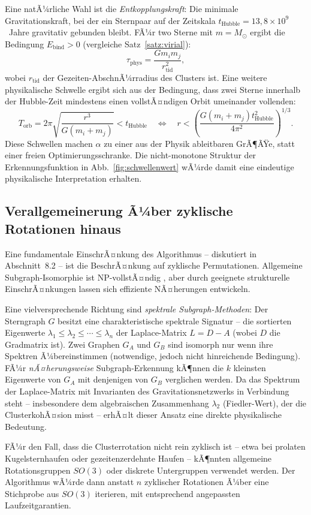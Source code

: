﻿\documentclass[a4paper,12pt]{report}
\theoremstyle{definition}
\begin{document}
Eine natÃ¼rliche Wahl ist die \emph{Entkopplungskraft}: Die minimale Gravitationskraft, bei der ein Sternpaar auf der Zeitskala $t_\mathrm{Hubble} = 13{,}8 \times 10^9$~Jahre gravitativ gebunden bleibt. FÃ¼r two Sterne mit $m = M_\odot$ ergibt die Bedingung $E_\mathrm{bind} > 0$ (vergleiche Satz~\ref{satz:virial}):
\[
\tau_\mathrm{phys} = \frac{G m_i m_j}{r_\mathrm{tid}^2},
\]
wobei $r_\mathrm{tid}$ der Gezeiten-AbschnÃ¼rradius des Clusters ist. Eine weitere physikalische Schwelle ergibt sich aus der Bedingung, dass zwei Sterne innerhalb der Hubble-Zeit mindestens einen vollstÃ¤ndigen Orbit umeinander vollenden:
\[
T_\mathrm{orb} = 2\pi \sqrt{\frac{r^3}{G(m_i + m_j)}} < t_\mathrm{Hubble} \quad \Longleftrightarrow \quad r < \left(\frac{G(m_i+m_j) t_\mathrm{Hubble}^2}{4\pi^2}\right)^{1/3}.
\]
Diese Schwellen machen $\alpha$ zu einer aus der Physik ableitbaren GrÃ¶ÃŸe, statt einer freien Optimierungsschranke. Die nicht-monotone Struktur der Erkennungsfunktion in Abb.~\ref{fig:schwellenwert} wÃ¼rde damit eine eindeutige physikalische Interpretation erhalten.

\subsection{Verallgemeinerung Ã¼ber zyklische Rotationen hinaus}

Eine fundamentale EinschrÃ¤nkung des Algorithmus -- diskutiert in Abschnitt~8.2 -- ist die BeschrÃ¤nkung auf zyklische Permutationen. Allgemeine Subgraph-Isomorphie ist NP-vollstÃ¤ndig \cite{cook1971}, aber durch geeignete strukturelle EinschrÃ¤nkungen lassen sich effiziente NÃ¤herungen entwickeln.

Eine vielversprechende Richtung sind \emph{spektrale Subgraph-Methoden}: Der Sterngraph $G$ besitzt eine charakteristische spektrale Signatur -- die sortierten Eigenwerte $\lambda_1 \leq \lambda_2 \leq \cdots \leq \lambda_n$ der Laplace-Matrix $L = D - A$ (wobei $D$ die Gradmatrix ist). Zwei Graphen $G_A$ und $G_B$ sind isomorph nur wenn ihre Spektren Ã¼bereinstimmen (notwendige, jedoch nicht hinreichende Bedingung). FÃ¼r \emph{nÃ¤herungsweise} Subgraph-Erkennung kÃ¶nnen die $k$ kleinsten Eigenwerte von $G_A$ mit denjenigen von $G_B$ verglichen werden. Da das Spektrum der Laplace-Matrix mit Invarianten des Gravitationsnetzwerks in Verbindung steht -- insbesondere dem algebraischen Zusammenhang $\lambda_2$ (Fiedler-Wert), der die ClusterkohÃ¤sion misst -- erhÃ¤lt dieser Ansatz eine direkte physikalische Bedeutung.

FÃ¼r den Fall, dass die Clusterrotation nicht rein zyklisch ist -- etwa bei prolaten Kugelsternhaufen oder gezeitenzerdehnte Haufen -- kÃ¶nnten allgemeine Rotationsgruppen $SO(3)$ oder diskrete Untergruppen verwendet werden. Der Algorithmus wÃ¼rde dann anstatt $n$ zyklischer Rotationen Ã¼ber eine Stichprobe aus $SO(3)$ iterieren, mit entsprechend angepassten Laufzeitgarantien.
\end{document}
